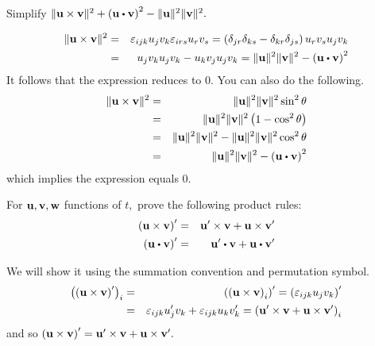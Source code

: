 \begin{enumialphparenastyle}
\begin{ex} Simplify $\norm{\vect{u}\times \vect{v}} ^{2}+\tup{
\vect{u}\dotprod \vect{v}} ^{2}-\norm{\vect{u}} ^{2}\norm{
\vect{v}} ^{2}.$
\begin{sol}
\begin{eqnarray*}
\norm{\vect{u}\times \vect{v}} ^{2} &=&\varepsilon
_{ijk}u_{j}v_{k}\varepsilon _{irs}u_{r}v_{s}=\tup{\delta _{jr}\delta
_{ks}-\delta _{kr}\delta _{js}} u_{r}v_{s}u_{j}v_{k} \\
&=&u_{j}v_{k}u_{j}v_{k}-u_{k}v_{j}u_{j}v_{k}=\norm{\vect{u}
} ^{2}\norm{\vect{v}} ^{2}-\tup{\vect{u}\dotprod \vect{v}} ^{2}
\end{eqnarray*}
It follows that the expression reduces to $0$. You can also do the following.
\begin{eqnarray*}
\norm{\vect{u}\times \vect{v}} ^{2} &=&\norm{\vect{u}
} ^{2}\norm{\vect{v}} ^{2}\sin ^{2}\theta \\
&=&\norm{\vect{u}} ^{2}\norm{\vect{v}}
^{2}\tup{1-\cos ^{2}\theta } \\
&=&\norm{\vect{u}} ^{2}\norm{\vect{v}}
^{2}-\norm{\vect{u}} ^{2}\norm{\vect{v}}
^{2}\cos ^{2}\theta \\
&=&\norm{\vect{u}} ^{2}\norm{\vect{v}}
^{2}-\tup{\vect{u}\dotprod \vect{v}} ^{2}
\end{eqnarray*}
which implies the expression equals $0$.
\end{sol}
\end{ex}

\begin{ex} For ${\bf u},{\bf v},{\bf w}$ functions of $t,$ prove the following product rules:
\begin{eqnarray*}
\tup{\vect{u}\times \vect{v}} ^{\prime } &=&\vect{u}^{\prime }\times
\vect{v}+\vect{u}\times \vect{v}^{\prime } \\
\tup{\vect{u}\dotprod \vect{v}} ^{\prime } &=&\vect{u}^{\prime }\dotprod
\vect{v}+\vect{u}\dotprod \vect{v}^{\prime }
\end{eqnarray*}
\begin{sol}
We will show it using the summation convention and permutation symbol.
\begin{eqnarray*}
\left(\left({\bf u}\times {\bf v}\right) ^{\prime }\right) _{i} &=
&\left(\left({\bf u}\times {\bf v}\right) _{i}\right) ^{\prime }=\left(
\varepsilon _{ijk}u_{j}v_{k}\right) ^{\prime } \\
&=&\varepsilon _{ijk}u_{j}^{\prime }v_{k}+\varepsilon
_{ijk}u_{k}v_{k}^{\prime }=\left({\bf u}^{\prime } \times
{\bf v}+{\bf u}\times {\bf v}^{\prime }\right) _{i}
\end{eqnarray*}
and so $\left({\bf u}\times {\bf v}\right) ^{\prime }={\bf u}^{\prime }
\times {\bf v}+{\bf u}\times {\bf v}^{\prime }.$ 
\end{sol}
\end{ex}

\end{enumialphparenastyle}